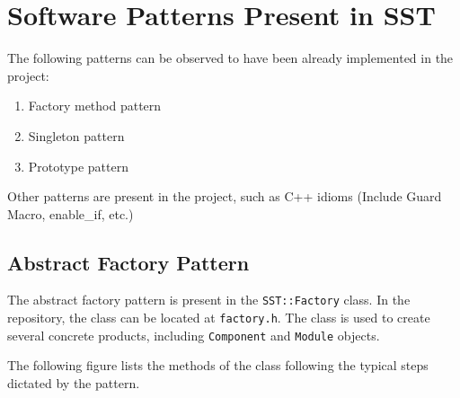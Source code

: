 
\section{Software Patterns Present in SST}
The following patterns can be observed to have been already implemented in the project:
\begin{enumerate}
    \item Factory method pattern
    \item Singleton pattern
    \item Prototype pattern
\end{enumerate}
Other patterns are present in the project, such as C++ idioms (Include Guard Macro, enable\_if, etc.)


\subsection{Abstract Factory Pattern}
The abstract factory pattern is present in the \texttt{SST::Factory} class. In the repository, the class can be located at \texttt{factory.h}. The class is used to create several concrete products, including \texttt{Component} and \texttt{Module} objects.

The following figure lists the methods of the class following the typical steps dictated by the pattern.



